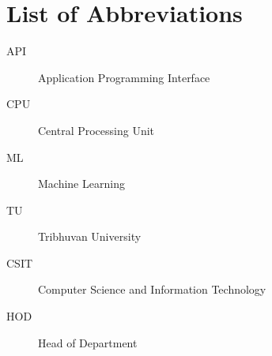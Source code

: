 \chapter*{List of Abbreviations}
\begin{description}
    \item[API] Application Programming Interface  
    \item[CPU] Central Processing Unit  
    \item[ML] Machine Learning  
    \item[TU] Tribhuvan University  
    \item[CSIT] Computer Science and Information Technology  
    \item[HOD] Head of Department  
\end{description}